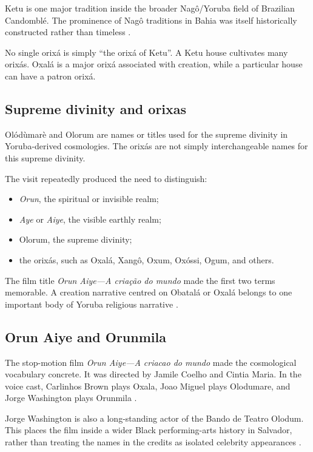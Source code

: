 Ketu is one major tradition inside the
broader Nag\^o/Yoruba field of Brazilian
Candombl\'e.  The prominence of Nag\^o
traditions in Bahia was itself historically
constructed rather than timeless
\cite{pares2010nago}.

No single orix\'a is simply ``the orix\'a
of Ketu''.  A Ketu house cultivates many
orix\'as.  Oxal\'a is a major orix\'a
associated with creation, while a
particular house can have a patron orix\'a.

\subsection{Supreme divinity and orixas}
\label{%
religion-section-supreme-divinity-orixas}

Ol\'od\`umar\`e and Olorum are names or
titles used for the supreme divinity in
Yoruba-derived cosmologies.  The orix\'as
are not simply interchangeable names for
this supreme divinity.

The visit repeatedly produced the need to
distinguish:

\begin{itemize}
\item \emph{Orun}, the spiritual or
invisible realm;
\item \emph{Aye} or \emph{Aiye}, the
visible earthly realm;
\item Olorum, the supreme divinity;
\item the orix\'as, such as Oxal\'a,
Xang\^o, Oxum, Ox\'ossi, Ogum, and others.
\end{itemize}

The film title
\emph{Orun Aiye---A cria\c{c}\~ao do mundo}
made the first two terms memorable.  A
creation narrative centred on Obatal\'a or
Oxal\'a belongs to one important body of
Yoruba religious narrative
\cite{marins2012obatala}.

\subsection{Orun Aiye and Orunmila}
\label{religion-section-orun-aiye-film}

The stop-motion film
\emph{Orun Aiye---A criacao do mundo}
made the cosmological vocabulary concrete.
It was directed by Jamile Coelho and Cintia
Maria.  In the voice cast, Carlinhos Brown
plays Oxala, Joao Miguel plays Olodumare,
and Jorge Washington plays Orunmila
\cite{orun-aiye-sepromi}.

Jorge Washington is also a long-standing
actor of the Bando de Teatro Olodum.  This
places the film inside a wider Black
performing-arts history in Salvador, rather
than treating the names in the credits as
isolated celebrity appearances
\cite{bando-jorge-washington}.

